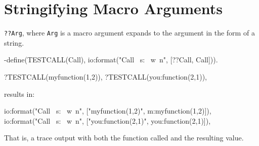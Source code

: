 \section{Stringifying Macro Arguments}
\texttt{??Arg}, where \texttt{Arg} is a macro argument expands to the
argument in the form of a string.

\begin{erlang}
-define(TESTCALL(Call), io:format("Call ~s: ~w~n", [??Call, Call])).

?TESTCALL(myfunction(1,2)),
?TESTCALL(you:function(2,1)),
\end{erlang}

results in:

\begin{erlang}
io:format("Call ~s: ~w~n", ["myfunction(1,2)", m:myfunction(1,2)]),
io:format("Call ~s: ~w~n", ["you:function(2,1)", you:function(2,1)]),
\end{erlang}

That is, a trace output with both the function called and the
resulting value.